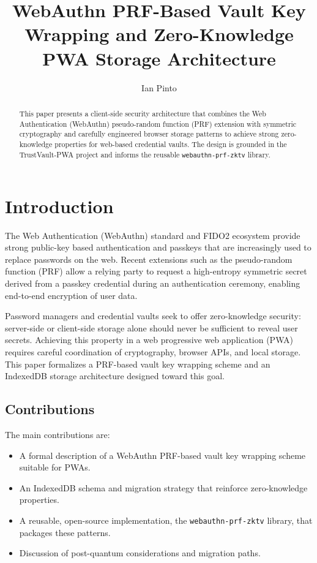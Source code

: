 \documentclass[runningheads]{llncs}
\begin{document}
\title{WebAuthn PRF-Based Vault Key Wrapping and Zero-Knowledge PWA Storage Architecture}

\author{
  Ian Pinto
}

\maketitle

\begin{abstract}
This paper presents a client-side security architecture that combines the Web Authentication (WebAuthn) pseudo-random function (PRF) extension with symmetric cryptography and carefully engineered browser storage patterns to achieve strong zero-knowledge properties for web-based credential vaults.
The design is grounded in the TrustVault-PWA project and informs the reusable \texttt{webauthn-prf-zktv} library.
\end{abstract}


\section{Introduction}
The Web Authentication (WebAuthn) standard and FIDO2 ecosystem provide strong public-key based authentication and passkeys that are increasingly used to replace passwords on the web.
Recent extensions such as the pseudo-random function (PRF) allow a relying party to request a high-entropy symmetric secret derived from a passkey credential during an authentication ceremony, enabling end-to-end encryption of user data.\cite{webauthn-prf-docs,bitwarden-prf-blog}

Password managers and credential vaults seek to offer zero-knowledge security: server-side or client-side storage alone should never be sufficient to reveal user secrets.
Achieving this property in a web progressive web application (PWA) requires careful coordination of cryptography, browser APIs, and local storage.
This paper formalizes a PRF-based vault key wrapping scheme and an IndexedDB storage architecture designed toward this goal.

\subsection{Contributions}
The main contributions are:
\begin{itemize}
  \item A formal description of a WebAuthn PRF-based vault key wrapping scheme suitable for PWAs.
  \item An IndexedDB schema and migration strategy that reinforce zero-knowledge properties.
  \item A reusable, open-source implementation, the \texttt{webauthn-prf-zktv} library, that packages these patterns.\cite{zktv-lib}
  \item Discussion of post-quantum considerations and migration paths.
\end{itemize}
\end{document}
